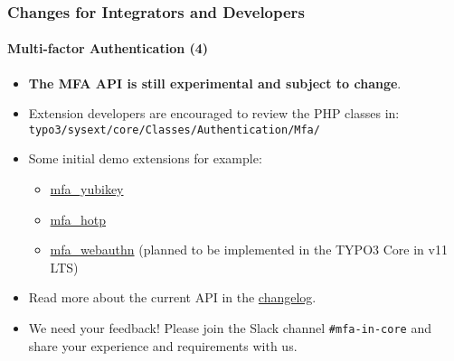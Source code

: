%

\begin{frame}[fragile]
	\frametitle{Changes for Integrators and Developers}
	\framesubtitle{Multi-factor Authentication (4)}

	\begin{itemize}

		\item \textbf{The MFA API is still experimental and subject to change}.

		\item Extension developers are encouraged to review the PHP classes in:\newline
			\small\texttt{typo3/sysext/core/Classes/Authentication/Mfa/}\normalsize

		\item Some initial demo extensions for example:

			\begin{itemize}\small
				\item \href{https://github.com/derhansen/mfa_yubikey}{mfa\_yubikey}
				\item \href{https://github.com/o-ba/mfa_hotp}{mfa\_hotp}
				\item \href{https://github.com/bnf/mfa_webauthn}{mfa\_webauthn} (planned to be implemented in the TYPO3 Core in v11 LTS)
			\end{itemize}\normalsize

		\item Read more about the current API in the
			\href{https://docs.typo3.org/c/typo3/cms-core/master/en-us/Changelog/11.1/Feature-93526-MultiFactorAuthentication.html}{changelog}.

		\item We need your feedback! Please join the Slack channel \texttt{\#mfa-in-core}
			and share your experience and requirements with us.

	\end{itemize}

\end{frame}

